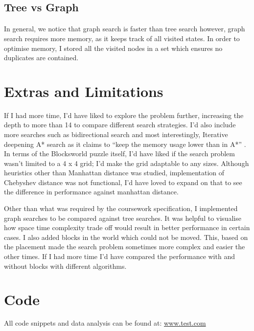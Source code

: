 \documentclass[10pt]{article}
\begin{document}
  \subsection{Tree vs Graph}
  \paragraph{} \indent
  In general, we notice that graph search is faster than tree search however, graph search requires more memory, as it keeps track of all visited states. In order to optimise memory, I stored all the visited nodes in a set which ensures no duplicates are contained. 

  \section{Extras and Limitations}
  \paragraph{} \indent
  If I had more time, I’d have liked to explore the problem further, increasing the depth to more than 14 to compare different search strategies. I’d also include more searches such as bidirectional search and most interestingly, Iterative deepening A* search as it claims to ``keep the memory usage lower than in A*'' \cite{ida*}. In terms of the Blocksworld puzzle itself, I'd have liked if the search problem wasn't limited to a 4 x 4 grid; I'd make the grid adaptable to any sizes. Although heuristics other than Manhattan distance was studied, implementation of Chebyshev distance \cite{chev} was not functional, I'd have loved to expand on that to see the difference in performance against manhattan distance. 

  Other than what was required by the coursework specification, I implemented graph searches to be compared against tree searches. It was helpful to visualise how space time complexity trade off would result in better performance in certain cases. I also added blocks in the world which could not be moved. This, based on the placement made the search problem sometimes more complex and easier the other times. If I had more time I'd have compared the performance with and without blocks with different algorithms.


 
 

  \section{Code}
  All code snippets and data analysis can be found at: \url{www.test.com}
\end{document}
